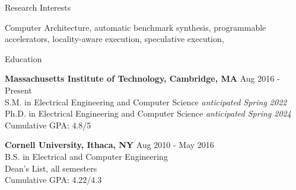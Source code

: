 \documentclass{resume} %
\begin{document}

\begin{rSection}{Research Interests}

Computer Architecture, automatic benchmark synthesis, programmable accelerators, locality-aware execution,
speculative execution,

\end{rSection}


\begin{rSection}{Education}

{\bf Massachusetts Institute of Technology, Cambridge, MA} \hfill { Aug 2016 - Present} \\ 
S.M. in Electrical Engineering and Computer Science \hfill { \it{anticipated} Spring 2022} \\
Ph.D. in Electrical Engineering and Computer Science \hfill { \it{anticipated} Spring 2024} \\
Cumulative GPA: 4.8/5

{\bf Cornell University, Ithaca, NY} \hfill { Aug 2010 - May 2016} \\ 
B.S. in Electrical and Computer Engineering \\
Dean's List, all semesters \\
Cumulative GPA: 4.22/4.3 

\end{rSection}

\end{document}
